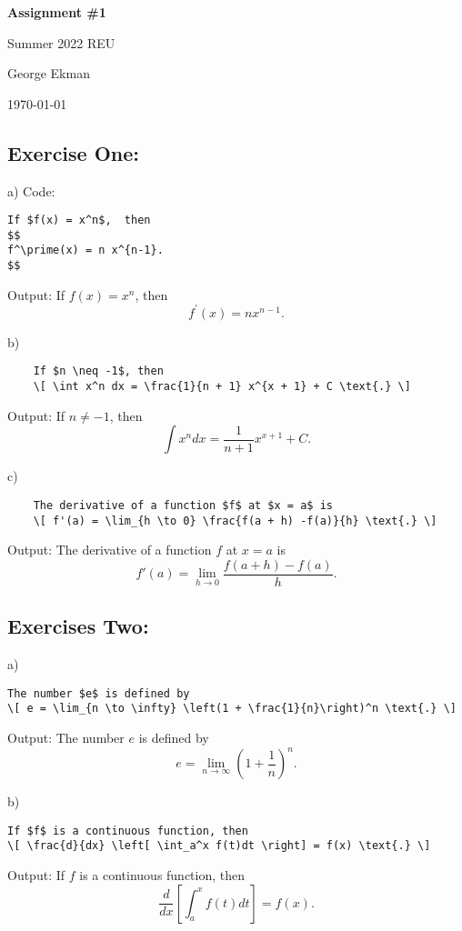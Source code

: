 \documentclass{article} %
\begin{document}
\begin{center}
	\Large{\textbf{Assignment \#1}

		Summer 2022 REU} \vspace{5pt} %

	\normalsize{ George Ekman

		\today}        %
	\vspace{15pt}

\end{center}

\subsection*{Exercise One:}

a) Code:
\begin{verbatim}
If $f(x) = x^n$,  then
$$
f^\prime(x) = n x^{n-1}.
$$
\end{verbatim}

Output: If $f(x) = x^n$, then $$ f^\prime(x) = n x^{n-1}. $$

\noindent b)
\begin{verbatim}
	If $n \neq -1$, then
	\[ \int x^n dx = \frac{1}{n + 1} x^{x + 1} + C \text{.} \]
\end{verbatim}
Output: If $n \neq -1$, then \[ \int x^n dx = \frac{1}{n + 1} x^{x + 1} + C \text{.} \]

\noindent c)
\begin{verbatim}
	The derivative of a function $f$ at $x = a$ is
	\[ f'(a) = \lim_{h \to 0} \frac{f(a + h) -f(a)}{h} \text{.} \]
\end{verbatim}
Output: The derivative of a function $f$ at $x = a$ is
\[ f'(a) = \lim_{h \to 0} \frac{f(a + h) -f(a)}{h} \text{.} \]

\subsection*{Exercises Two:}
\noindent a)
\begin{verbatim}
The number $e$ is defined by
\[ e = \lim_{n \to \infty} \left(1 + \frac{1}{n}\right)^n \text{.} \]
\end{verbatim}
Output: The number $e$ is defined by
\[ e = \lim_{n \to \infty} \left(1 + \frac{1}{n}\right)^n \text{.} \]

\noindent b)
\begin{verbatim}
If $f$ is a continuous function, then
\[ \frac{d}{dx} \left[ \int_a^x f(t)dt \right] = f(x) \text{.} \]
\end{verbatim}
Output: If $f$ is a continuous function, then
\[ \frac{d}{dx} \left[ \int_a^x f(t)dt \right] = f(x) \text{.} \]
\end{document}
